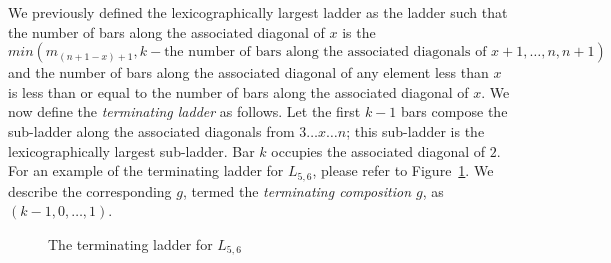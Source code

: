 \begin{theorem}
\begin{theorem}
We previously defined the lexicographically largest ladder as the 
ladder such that the number of bars along the associated diagonal of $x$ is the $min(m_{(n+1-x)+1}, k-\text{the number of bars along the associated diagonals of } x+1,\dots,n,n+1)$ 
and the number of bars along the associated diagonal of any element less than $x$ is less than or equal to the number of bars along the 
associated diagonal of $x$.
We now define the \emph{terminating ladder} as follows. Let the 
first $k-1$ bars compose the sub-ladder along the associated diagonals from $3 \dots x \dots n$; this sub-ladder is the 
lexicographically largest sub-ladder. Bar $k$ occupies the associated diagonal of $2$. For an example of the terminating ladder 
for $L_{5, 6}$, please refer to Figure~\ref{Fig:TerminatingLadder}. We describe the corresponding $g$, termed 
the \emph{terminating composition $g$}, as $(k-1, 0, \dots, 1)$. 
\begin{figure}[h]
  \centering 
  \caption{The terminating ladder for $L_{5,6}$}
  \label{Fig:TerminatingLadder}
\end{figure}


\end{theorem}
\end{theorem}
